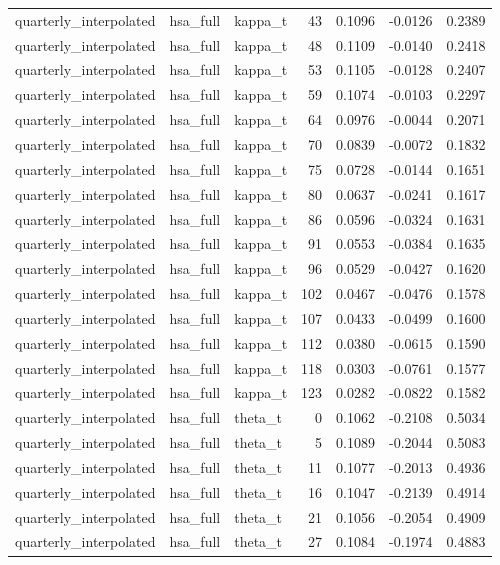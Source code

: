 \begin{tabular}{lllrrrr}
quarterly\_interpolated & hsa\_full & kappa\_t & 43 & 0.1096 & -0.0126 & 0.2389 \\
quarterly\_interpolated & hsa\_full & kappa\_t & 48 & 0.1109 & -0.0140 & 0.2418 \\
quarterly\_interpolated & hsa\_full & kappa\_t & 53 & 0.1105 & -0.0128 & 0.2407 \\
quarterly\_interpolated & hsa\_full & kappa\_t & 59 & 0.1074 & -0.0103 & 0.2297 \\
quarterly\_interpolated & hsa\_full & kappa\_t & 64 & 0.0976 & -0.0044 & 0.2071 \\
quarterly\_interpolated & hsa\_full & kappa\_t & 70 & 0.0839 & -0.0072 & 0.1832 \\
quarterly\_interpolated & hsa\_full & kappa\_t & 75 & 0.0728 & -0.0144 & 0.1651 \\
quarterly\_interpolated & hsa\_full & kappa\_t & 80 & 0.0637 & -0.0241 & 0.1617 \\
quarterly\_interpolated & hsa\_full & kappa\_t & 86 & 0.0596 & -0.0324 & 0.1631 \\
quarterly\_interpolated & hsa\_full & kappa\_t & 91 & 0.0553 & -0.0384 & 0.1635 \\
quarterly\_interpolated & hsa\_full & kappa\_t & 96 & 0.0529 & -0.0427 & 0.1620 \\
quarterly\_interpolated & hsa\_full & kappa\_t & 102 & 0.0467 & -0.0476 & 0.1578 \\
quarterly\_interpolated & hsa\_full & kappa\_t & 107 & 0.0433 & -0.0499 & 0.1600 \\
quarterly\_interpolated & hsa\_full & kappa\_t & 112 & 0.0380 & -0.0615 & 0.1590 \\
quarterly\_interpolated & hsa\_full & kappa\_t & 118 & 0.0303 & -0.0761 & 0.1577 \\
quarterly\_interpolated & hsa\_full & kappa\_t & 123 & 0.0282 & -0.0822 & 0.1582 \\
quarterly\_interpolated & hsa\_full & theta\_t & 0 & 0.1062 & -0.2108 & 0.5034 \\
quarterly\_interpolated & hsa\_full & theta\_t & 5 & 0.1089 & -0.2044 & 0.5083 \\
quarterly\_interpolated & hsa\_full & theta\_t & 11 & 0.1077 & -0.2013 & 0.4936 \\
quarterly\_interpolated & hsa\_full & theta\_t & 16 & 0.1047 & -0.2139 & 0.4914 \\
quarterly\_interpolated & hsa\_full & theta\_t & 21 & 0.1056 & -0.2054 & 0.4909 \\
quarterly\_interpolated & hsa\_full & theta\_t & 27 & 0.1084 & -0.1974 & 0.4883 \\

\end{tabular}
